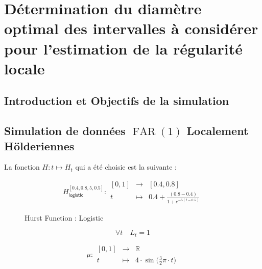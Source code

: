 \chapter{Détermination du diamètre optimal des intervalles à considérer pour l'estimation de la régularité locale }
\minitoc%

\section{Introduction et Objectifs de la simulation}

\section{Simulation de données $\operatorname{FAR}(1)$ Localement Hölderiennes}

La fonction $H : t \mapsto H_t$ qui a été choisie est la suivante :

$$
H^{[0.4, 0.8, 5, 0.5]}_{\textsf{logistic}} : \begin{array}{ccc}
    [0,1] & \longrightarrow & [0.4, 0.8]
    \\
    t & \longmapsto & 0.4 + \frac{(0.8 - 0.4)}{1 + e^{-5(t - 0.5)}}
\end{array}
$$

\begin{figure}[H]
    \centering
    \caption{Hurst Function : Logistic}
    \label{plot:hurst-logistic}
\end{figure}

$$\forall t \quad L_t = 1$$

$$
\mu : \begin{array}{ccc}
    [0,1] & \longrightarrow & \mathbb R
    \\
    t & \longmapsto & 4 \cdot \sin\bigl( \frac 3 2 \pi \cdot t \bigr)
\end{array}
$$
    
